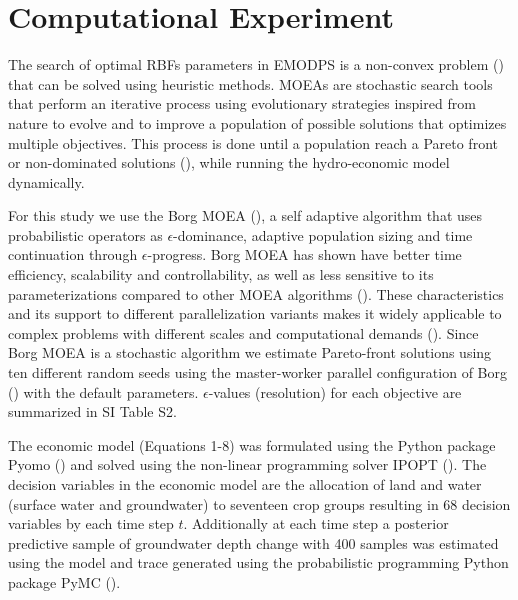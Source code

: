 \documentclass[11pt,a4paper]{article}
\begin{document}
\section{Computational Experiment}

The search of optimal RBFs parameters in EMODPS is a non-convex problem (\cite{giuliani_curses_2016}) that can be solved using heuristic methods. MOEAs are stochastic search tools that perform an iterative process using evolutionary strategies inspired from nature to evolve and to improve a population of possible solutions that optimizes multiple objectives. This process is done until a population reach a Pareto front or non-dominated solutions (\cite{coello_evolutionary_2007}), while running the hydro-economic model dynamically. 

For this study we use the Borg MOEA (\cite{hadka_borg_2013}), a self adaptive algorithm that uses probabilistic operators as $\epsilon$-dominance, adaptive population sizing and time continuation through $\epsilon$-progress. Borg MOEA has shown have better time efficiency, scalability and controllability, as well as less sensitive to its parameterizations compared to other MOEA algorithms (\cite{reed_evolutionary_2013}).  These characteristics and its support to different parallelization variants makes it widely applicable to complex problems with different scales and computational demands (\cite{hadka_large-scale_2015}). Since Borg MOEA is a stochastic algorithm we estimate Pareto-front solutions using ten different random seeds using the master-worker parallel configuration of Borg (\cite{hadka_large-scale_2015}) with the default parameters. $\epsilon$-values (resolution) for each objective are summarized in SI Table S2. 

The economic model (Equations 1-8) was formulated using the Python package Pyomo (\cite{hart_pyomo_2011}) and solved using the non-linear programming solver IPOPT (\cite{wachter_implementation_2006}). The decision variables in the economic model are the allocation of land and water (surface water and groundwater) to seventeen crop groups resulting in 68 decision variables by each time step $t$. Additionally at each time step a posterior predictive sample of groundwater depth change with 400 samples was estimated using the model and trace generated using the probabilistic programming Python package PyMC  (\cite{salvatier_probabilistic_2016}).
\end{document}
